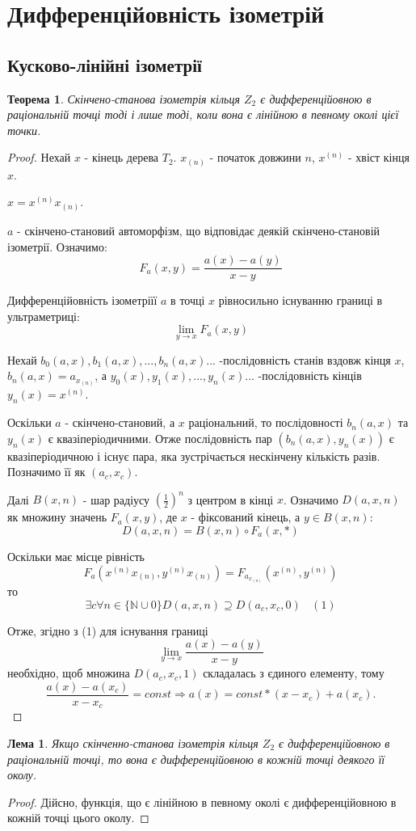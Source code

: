 \documentclass[a4paper,12pt]{article} \usepackage{a4wide}
\numberwithin{equation}{subsection}
\newtheorem{theorem}{Теорема}[subsection]
\newtheorem{lemma}{Лема}[subsection]
\begin{document}
\newpage

\section{Дифференційовність ізометрій}


\subsection{Кусково-лінійні ізометрії}
\begin{theorem}\label{lin_rational_point}
  Скінчено-станова ізометрія кільця $Z_2$ є дифференційовною в
  раціональній точці тоді і лише тоді, коли вона є лінійною в певному
  околі цієї точки.
\end{theorem}

\begin{proof}Нехай $x$ - кінець дерева $T_2$. $x_{(n)}$ - початок
  довжини $n$, $x^{(n)}$ - хвіст кінця $x$.

  $x=x^{(n)}x_{(n)}$.

  $a$ - скінчено-становий автоморфізм, що відповідає деякій
  скінчено-становій ізометрії. Означимо:
$$F_a(x,y)=\frac{a(x)-a(y)}{x-y}$$

Дифференційовність ізометріїї $a$ в точці $x$ рівносильно існуванню
границі в ультраметриці:
 $$\lim_{y\rightarrow x}F_a(x,y)$$

 Нехай $b_0(a,x),b_1(a,x),...,b_n(a,x)...$ -послідовність станів
 вздовж кінця $x$, $b_n(a,x)=a_{x_{(n)}}$, а
 $y_0(x),y_1(x),...,y_n(x)...$ -послідовність кінців $y_n(x)=x^{(n)}$.

 Оскільки $a$ - скінчено-становий, а $x$ раціональний, то
 послідовності $b_n(a,x)$ та $y_n(x)$ є квазіперіодичними. Отже
 послідовність пар $(b_n(a,x),y_n(x))$ є квазіперіодичною і існує
 пара, яка зустрічається нескінчену кількість разів. Позначимо її як
 $(a_c,x_c)$.

 Далі $B(x,n)$ - шар радіусу $(\frac{1}{2})^n$ з центром в кінці $x$.  Означимо
 $D(a,x,n)$ як множину значень $F_a(x,y)$, де $x$ - фіксований кінець,
 а $y\in B(x,n)$:
$$D(a,x,n)=B(x,n)\circ F_a(x,*)$$

Оскільки має місце рівність
$$F_a(x^{(n)}x_{(n)},y^{(n)}x_{(n)})=F_{a_{x_{(n)}}}(x^{(n)},y^{(n)})$$
то
$$\exists c \forall n \in \{\mathbb{N}\cup 0\} D(a,x,n)\supseteq D(a_c,x_c,0) \ \ \ \ (1)$$

Отже, згідно з (1) для існування границі $$\lim_{y\rightarrow
  x}\frac{a(x)-a(y)}{x-y}$$ необхідно, щоб множина $D(a_c,x_c,1)$
складалась з єдиного елементу, тому
$$\frac{a(x)-a(x_c)}{x-x_c}=const \Rightarrow
a(x)=const*(x-x_c)+a(x_c).$$

\end{proof}
\begin{lemma}\label{diff_rational_point}
  Якщо скінченно-станова ізометрія кільця $Z_2$ є дифференційовною в
  раціональній точці, то вона є дифференційовною в кожній точці
  деякого її околу.
\end{lemma}
\begin{proof}
  Дійсно, функція, що є лінійною в певному околі є дифференційовною в
  кожній точці цього околу.
\end{proof}
\end{document}
